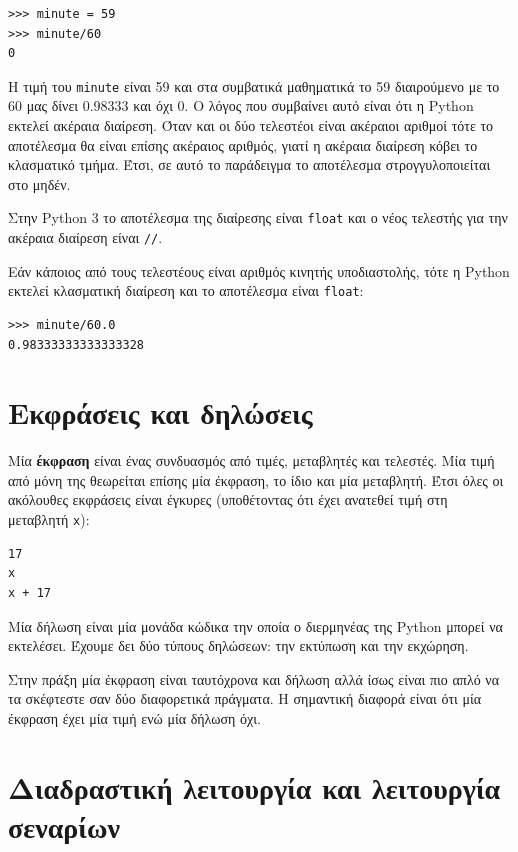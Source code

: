 \documentclass[10pt]{book}
\begin{document}
\begin{verbatim}
>>> minute = 59
>>> minute/60
0
\end{verbatim}
%

Η τιμή του {\tt minute} είναι 59 και στα συμβατικά μαθηματικά
το 59 διαιρούμενο με το 60 μας δίνει 0.98333 και όχι 0. Ο λόγος που
συμβαίνει αυτό είναι ότι η Python εκτελεί ακέραια διαίρεση.  
Όταν και οι δύο τελεστέοι είναι ακέραιοι αριθμοί τότε το αποτέλεσμα θα είναι
επίσης ακέραιος αριθμός, γιατί η ακέραια διαίρεση κόβει το κλασματικό
τμήμα. Έτσι, σε αυτό το παράδειγμα το αποτέλεσμα στρογγυλοποιείται
στο μηδέν.


Στην Python 3 το αποτέλεσμα της διαίρεσης είναι {\tt float} και   
ο νέος τελεστής για την ακέραια διαίρεση είναι {\tt //}.

Εάν κάποιος από τους τελεστέους είναι αριθμός κινητής υποδιαστολής, τότε 
η Python εκτελεί κλασματική διαίρεση και το αποτέλεσμα είναι
{\tt float}:

\begin{verbatim}
>>> minute/60.0
0.98333333333333328
\end{verbatim}


\section{Εκφράσεις και δηλώσεις}

Μία {\bf έκφραση} είναι ένας συνδυασμός από τιμές, μεταβλητές και τελεστές.  
Μία τιμή από μόνη της θεωρείται επίσης μία έκφραση, το ίδιο και μία
μεταβλητή. Έτσι όλες οι ακόλουθες εκφράσεις είναι έγκυρες
(υποθέτοντας ότι έχει ανατεθεί τιμή στη μεταβλητή {\tt x}): 				

\begin{verbatim}
17
x
x + 17
\end{verbatim}
%

Μία δήλωση είναι μία μονάδα κώδικα την οποία ο διερμηνέας της Python
μπορεί να εκτελέσει. Έχουμε δει δύο τύπους δηλώσεων: την εκτύπωση
και την εκχώρηση.

Στην πράξη μία έκφραση είναι ταυτόχρονα και δήλωση αλλά ίσως είναι πιο
απλό να τα σκέφτεστε σαν δύο διαφορετικά πράγματα. Η σημαντική διαφορά
είναι ότι μία έκφραση έχει μία τιμή ενώ μία δήλωση όχι.


\section{Διαδραστική λειτουργία και λειτουργία σεναρίων}
\end{document}
